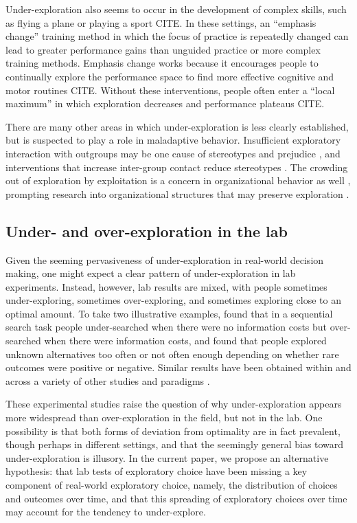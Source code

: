 \documentclass[10pt,letterpaper]{article}
\begin{document}
Under-exploration also seems to occur in the development of complex skills, such
as flying a plane or playing a sport CITE. In these settings, an ``emphasis
change'' training method in which the focus of practice is repeatedly changed
can lead to greater performance gains than unguided practice or more complex
training methods. Emphasis change works because it encourages people to
continually explore the performance space to find more effective cognitive and
motor routines CITE. Without these interventions, people often enter a ``local
maximum'' in which exploration decreases and performance plateaus CITE.

There are many other areas in which under-exploration is less clearly
established, but is suspected to play a role in maladaptive behavior.
Insufficient exploratory interaction with outgroups may be one cause of
stereotypes and prejudice \citep{Denrell2005most}, and interventions that
increase inter-group contact reduce stereotypes \citep{Shook2008}. The crowding
out of exploration by exploitation is a concern in organizational behavior as
well \citep{March1991, Levinthal1993}, prompting research into organizational
structures that may preserve exploration \citep{Fang2010}.

\subsection{Under- and over-exploration in the lab}

Given the seeming pervasiveness of under-exploration in real-world decision
making, one might expect a clear pattern of under-exploration in lab
experiments. Instead, however, lab results are mixed, with people sometimes
under-exploring, sometimes over-exploring, and sometimes exploring close to an
optimal amount. To take two illustrative examples, \citet{Zwick2003} found that
in a sequential search task people under-searched when there were no information
costs but over-searched when there were information costs, and
\citet{Teodorescu2014} found that people explored unknown alternatives too often
or not often enough depending on whether rare outcomes were positive or
negative. Similar results have been obtained within and across a variety of
other studies and paradigms
\citep{tversky1966information, Busemeyer1988, hertwig2004decisions, Navarro2016, Juni2016, Sang2011}.

These experimental studies raise the question of why under-exploration appears
more widespread than over-exploration in the field, but not in the lab. One
possibility is that both forms of deviation from optimality are in fact
prevalent, though perhaps in different settings, and that the seemingly general bias
toward under-exploration is illusory. In the current paper, we propose an
alternative hypothesis: that lab tests of exploratory choice have been missing a key component
of real-world exploratory choice, namely, the distribution of choices and
outcomes over time, and that this spreading of exploratory choices over time may
account for the tendency to under-explore.
\end{document}
